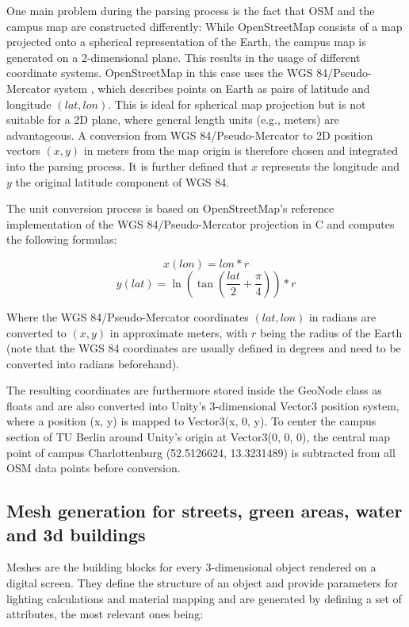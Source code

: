 One main problem during the parsing process is the fact that OSM and the campus map are constructed differently: While OpenStreetMap consists of a map projected onto a spherical representation of the Earth, the campus map is generated on a 2-dimensional plane. This results in the usage of different coordinate systems. OpenStreetMap in this case uses the WGS 84/Pseudo-Mercator system \cite{pseudo_mercator_1} \cite{pseudo_mercator_2}, which describes points on Earth as pairs of latitude and longitude $(lat, lon)$. This is ideal for spherical map projection but is not suitable for a 2D plane, where general length units (e.g., meters) are advantageous. A conversion from WGS 84/Pseudo-Mercator to 2D position vectors $(x, y)$ in meters from the map origin is therefore chosen and integrated into the parsing process. It is further defined that $x$ represents the longitude and $y$ the original latitude component of WGS 84.

The unit conversion process is based on OpenStreetMap's reference implementation of the WGS 84/Pseudo-Mercator projection \cite{mercator_projection_implementation} in C and computes the following formulas:

\[x(lon) = lon * r\]
\[y(lat) = \ln(\tan(\frac{lat}{2} + \frac{\pi}{4})) * r\]

Where the WGS 84/Pseudo-Mercator coordinates $(lat, lon)$ in radians are converted to $(x, y)$ in approximate meters, with $r$ being the radius of the Earth (note that the WGS 84 coordinates are usually defined in degrees and need to be converted into radians beforehand).

The resulting coordinates are furthermore stored inside the GeoNode class as floats and are also converted into Unity's 3-dimensional Vector3 position system, where a position (x, y) is mapped to Vector3(x, 0, y). To center the campus section of TU Berlin around Unity's origin at Vector3(0, 0, 0), the central map point of campus Charlottenburg (52.5126624, 13.3231489) is subtracted from all OSM data points before conversion.

\subsection{Mesh generation for streets, green areas, water and 3d buildings}
Meshes are the building blocks for every 3-dimensional object rendered on a digital screen. They define the structure of an object and provide parameters for lighting calculations and material mapping and are generated by defining a set of attributes, the most relevant ones being:

